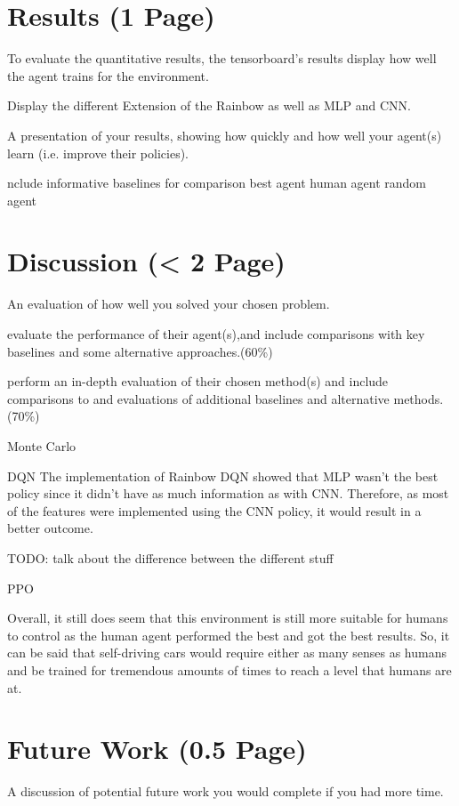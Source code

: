 \documentclass{article}
\begin{document}
\section{Results (1 Page)}
To evaluate the quantitative results, the tensorboard's results display how well the agent trains for the environment.

Display the different Extension of the Rainbow as well as MLP and CNN.

A presentation of your results, showing how quickly and how well your agent(s) learn (i.e. improve their policies).

nclude informative baselines for comparison 
best agent
human agent
random agent



\section{Discussion (< 2 Page)}
An evaluation of how well you solved your chosen problem.

evaluate the performance of their agent(s),and include comparisons with key baselines and some alternative approaches.(60\%)



perform an in-depth evaluation of their chosen method(s) and include comparisons to and evaluations of additional baselines and alternative methods.(70\%)

Monte Carlo

DQN
The implementation of Rainbow DQN showed that MLP wasn't the best policy since it didn't have as much information as with CNN.
Therefore, as most of the features were implemented using the CNN policy, it would result in a better outcome.

TODO: talk about the difference between the different stuff

PPO

Overall, it still does seem that this environment is still more suitable for humans to control as the human agent performed the best and got the best results.
So, it can be said that self-driving cars would require either as many senses as humans and be trained for tremendous amounts of times to reach a level that humans are at.




\section{Future Work (0.5 Page)}
A discussion of potential future work you would complete if you had more time.
\end{document}
